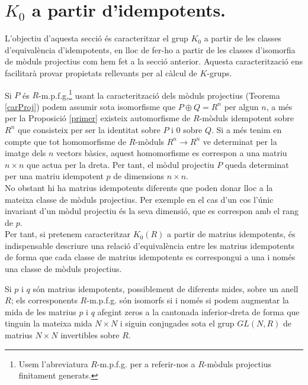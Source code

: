 \section{$K_0$ a partir d'idempotents.}
L'objectiu d'aquesta secció és caracteritzar el grup $K_0$ a partir de les classes d'equivalència d'idempotents, en lloc de fer-ho a partir de les classes d'isomorfia de mòduls projectius com hem fet a la secció anterior. Aquesta caracterització ens facilitarà provar propietats rellevants per al càlcul de $K$-grups. 

\indent Si $P$ és $R$-m.p.f.g,\footnote{Usem l'abreviatura $R$-m.p.f.g. per a referir-nos a $R$-mòduls projectius finitament generats.} usant la caracterització dels mòduls projectius (Teorema \ref{carProj}) podem assumir sota isomorfisme que $P\oplus Q = R^n$ per algun $n$, a més per la Proposició \ref{primer}  existeix automorfisme de $R$-mòduls idempotent sobre $R^n$ que consisteix per ser la identitat sobre $P$ i 0 sobre $Q$. Si a més tenim en compte que tot homomorfisme de $R$-mòduls $R^n\rightarrow R^n$ ve determinat per la imatge dels $n$ vectors bàsics, aquest homomorfisme es correspon a una matriu $n\times n$ que actua per la dreta. Per tant, el mòdul projectiu $P$ queda determinat per una matriu idempotent $p$ de dimensions $n\times n$.
\\
\indent
No obstant hi ha matrius idempotents diferents que poden donar lloc a la mateixa classe de mòduls projectius.
Per exemple en el cas d'un cos l'únic invariant d'un mòdul projectiu és la seva dimensió, que es correspon amb el rang de $p$.\\
Per tant, si pretenem caracteritzar $K_0(R)$ a partir de matrius idempotents, és indispensable descriure una relació d'equivalència entre les matrius idempotents de forma que cada classe de matrius idempotents es correspongui a una i només una classe de mòduls projectius.

\begin{lema}
Si $p$ i $q$ són matrius idempotents, possiblement de diferents mides, sobre un anell $R$; els corresponents $R$-m.p.f.g. són isomorfs si i només si podem augmentar la mida de les matrius $p$ i $q$ afegint zeros a la cantonada inferior-dreta de forma que tinguin la mateixa mida $N\times N$ i siguin conjugades sota el grup $GL(N,R)$ de matrius $N\times N$ invertibles sobre $R$. 
\end{lema}


